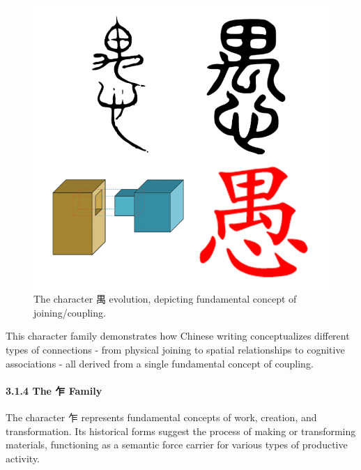 \begin{figure}
\centering
\includegraphics{./images/zi_join.png}
\caption{The character 禺 evolution, depicting fundamental concept of
joining/coupling.}
\end{figure}

This character family demonstrates how Chinese writing conceptualizes
different types of connections - from physical joining to spatial
relationships to cognitive associations - all derived from a single
fundamental concept of coupling.

\paragraph{3.1.4 The 乍 Family}\label{the-ux4e4d-family}

The character 乍 represents fundamental concepts of work, creation, and
transformation. Its historical forms suggest the process of making or
transforming materials, functioning as a semantic force carrier for
various types of productive activity.


